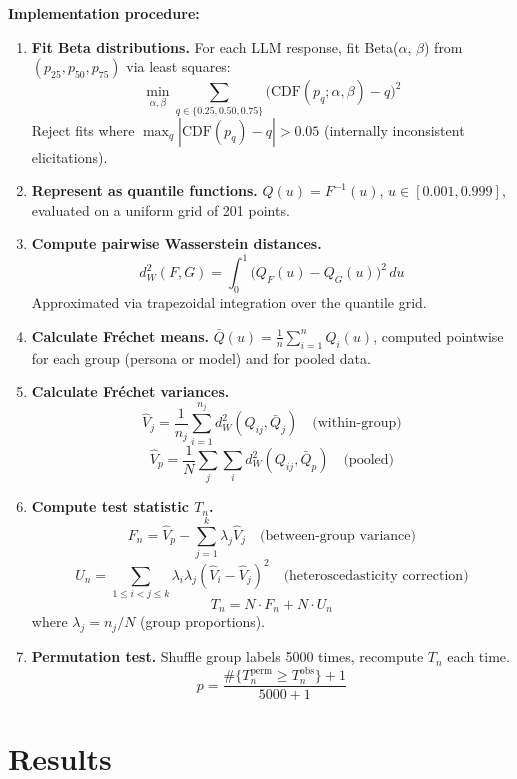 \documentclass[midterm]{sparreport}
\begin{document}
\textbf{Implementation procedure:}
\begin{enumerate}
\item \textbf{Fit Beta distributions.} For each LLM response, fit Beta($\alpha$, $\beta$) from $(p_{25}, p_{50}, p_{75})$ via least squares:
$$\min_{\alpha,\beta} \sum_{q \in \{0.25, 0.50, 0.75\}} \bigl( \mathrm{CDF}(p_q; \alpha, \beta) - q \bigr)^2$$
Reject fits where $\max_q |\mathrm{CDF}(p_q) - q| > 0.05$ (internally inconsistent elicitations).

\item \textbf{Represent as quantile functions.} $Q(u) = F^{-1}(u)$, $u \in [0.001, 0.999]$, evaluated on a uniform grid of 201 points.

\item \textbf{Compute pairwise Wasserstein distances.}
$$d_W^2(F,G) = \int_0^1 \bigl(Q_F(u) - Q_G(u)\bigr)^2\, du$$
Approximated via trapezoidal integration over the quantile grid.

\item \textbf{Calculate Fréchet means.} $\bar{Q}(u) = \frac{1}{n}\sum_{i=1}^{n} Q_i(u)$, computed pointwise for each group (persona or model) and for pooled data.

\item \textbf{Calculate Fréchet variances.}
$$\hat{V}_j = \frac{1}{n_j} \sum_{i=1}^{n_j} d_W^2(Q_{ij}, \bar{Q}_j) \quad \text{(within-group)}$$
$$\hat{V}_p = \frac{1}{N} \sum_{j}\sum_{i} d_W^2(Q_{ij}, \bar{Q}_p) \quad \text{(pooled)}$$

\item \textbf{Compute test statistic $T_n$.}
$$F_n = \hat{V}_p - \sum_{j=1}^{k} \lambda_j \hat{V}_j \quad \text{(between-group variance)}$$
$$U_n = \sum_{1 \le i < j \le k} \lambda_i \lambda_j (\hat{V}_i - \hat{V}_j)^2 \quad \text{(heteroscedasticity correction)}$$
$$T_n = N \cdot F_n + N \cdot U_n$$
where $\lambda_j = n_j / N$ (group proportions).

\item \textbf{Permutation test.} Shuffle group labels 5000 times, recompute $T_n$ each time.
$$p = \frac{\#\{T_n^{\text{perm}} \ge T_n^{\text{obs}}\} + 1}{5000 + 1}$$
\end{enumerate}

\section{Results}
\end{document}
